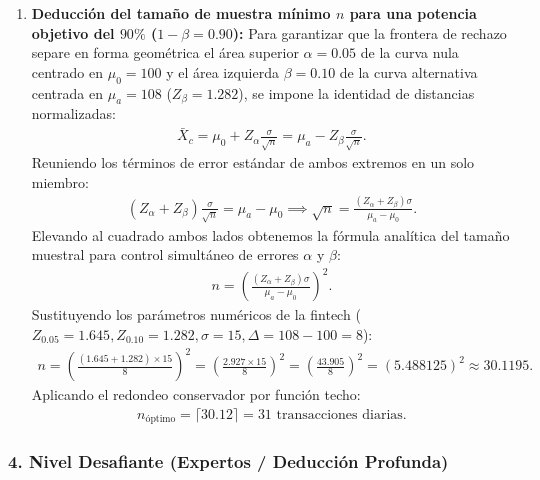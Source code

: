 \begin{solproblema}
\begin{enumerate}
		\item \textbf{Deducción del tamaño de muestra mínimo $n$ para una potencia objetivo del $90\%$ ($1-\beta = 0.90$):}
		Para garantizar que la frontera de rechazo separe en forma geométrica el área superior $\alpha = 0.05$ de la curva nula centrado en $\mu_0 = 100$ y el área izquierda $\beta = 0.10$ de la curva alternativa centrada en $\mu_a = 108$ ($Z_\beta = 1.282$), se impone la identidad de distancias normalizadas:
		\begin{align}
			\bar{X}_c = \mu_0 + Z_\alpha \frac{\sigma}{\sqrt{n}} = \mu_a - Z_\beta \frac{\sigma}{\sqrt{n}}.
		\end{align}
		Reuniendo los términos de error estándar de ambos extremos en un solo miembro:
		\begin{align}
			(Z_\alpha + Z_\beta)\frac{\sigma}{\sqrt{n}} = \mu_a - \mu_0 \implies \sqrt{n} = \frac{(Z_\alpha + Z_\beta)\sigma}{\mu_a - \mu_0}.
		\end{align}
		Elevando al cuadrado ambos lados obtenemos la fórmula analítica del tamaño muestral para control simultáneo de errores $\alpha$ y $\beta$:
		\begin{align}
			n = \left( \frac{(Z_\alpha + Z_\beta)\sigma}{\mu_a - \mu_0} \right)^2.
		\end{align}
		Sustituyendo los parámetros numéricos de la fintech ($Z_{0.05} = 1.645, Z_{0.10} = 1.282, \sigma = 15, \Delta = 108 - 100 = 8$):
		\begin{align}
			n = \left( \frac{(1.645 + 1.282) \times 15}{8} \right)^2 = \left( \frac{2.927 \times 15}{8} \right)^2 = \left( \frac{43.905}{8} \right)^2 = (5.488125)^2 \approx 30.1195.
		\end{align}
		Aplicando el redondeo conservador por función techo:
		\begin{align}
			n_{\text{óptimo}} = \lceil 30.12 \rceil = 31 \text{ transacciones diarias.}
		\end{align}
	\end{enumerate}
\end{solproblema}

\subsubsection*{4. Nivel Desafiante (Expertos / Deducción Profunda)}

